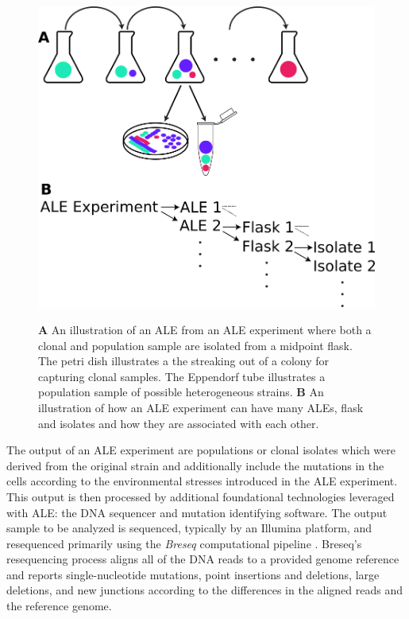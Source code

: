 \documentclass[12pt,final,masters,chapterheads]{ucsd}  %
\begin{document}
\begin{figure}[h!]
  \caption{\textbf{A} An illustration of an ALE from an ALE experiment where both a clonal and population sample are isolated from a midpoint flask. The petri dish illustrates a the streaking out of a colony for capturing clonal samples. The Eppendorf tube illustrates a population sample of possible heterogeneous strains. \textbf{B} An illustration of how an ALE experiment can have many ALEs, flask and isolates and how they are associated with each other.}
  \centering
  \includegraphics[width=1\textwidth]{ale_experiment_samples.png}
  \label{fig:ale_experiment_samples}
\end{figure}
The output of an ALE experiment are populations or clonal isolates which were derived from the original strain and additionally include the mutations in the cells according to the environmental stresses introduced in the ALE experiment. This output is then processed by additional foundational technologies leveraged with ALE: the DNA sequencer and mutation identifying software. The output sample to be analyzed is sequenced, typically by an Illumina platform, and resequenced primarily using the \textit{Breseq} computational pipeline \cite{breseq_paper}. Breseq's resequencing process aligns all of the DNA reads to a provided genome reference and reports single-nucleotide mutations, point insertions and deletions, large deletions, and new junctions according to the differences in the aligned reads and the reference genome.
\end{document}
